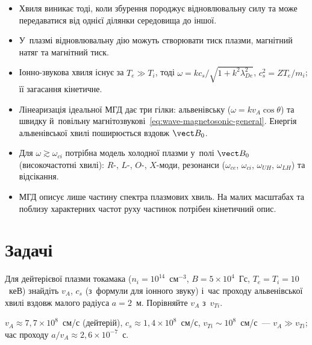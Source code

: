 \begin{Summary}
\begin{itemize}
\item Хвиля виникає тоді, коли збурення породжує відновлювальну силу та може передаватися
  від однієї ділянки середовища до іншої.

\item У~плазмі відновлювальну дію можуть створювати тиск плазми, магнітний натяг та
  магнітний тиск.

\item Іонно-звукова хвиля існує за $T_e\gg T_i$, тоді $\omega=kc_s/\sqrt{1+k^2\lambda_{De}^2}$, $c_s^2=ZT_e/m_i$; її загасання
  кінетичне.

\item Лінеаризація ідеальної МГД дає три гілки: альвенівську ($\omega=k v_A\cos\theta$) та швидку й~повільну
  магнітозвукові~\eqref{eq:wave-magnetosonic-general}. Енергія альвенівської хвилі
  поширюється вздовж $\vect B_0$.

\item Для $\omega\gtrsim\omega_{ci}$ потрібна модель холодної плазми у~полі $\vect B_0$ (високочастотні хвилі): $R$-, $L$-,
  $O$-, $X$-моди, резонанси ($\omega_{ce}$, $\omega_{ci}$, $\omega_{UH}$, $\omega_{LH}$) та відсікання.

\item МГД описує лише частину спектра плазмових хвиль. На малих масштабах та поблизу
  характерних частот руху частинок потрібен кінетичний опис.
\end{itemize}
\end{Summary}



\section*{Задачі}

\begin{problem}\label{prb:AlfvenSpeed}
	Для дейтерієвої плазми токамака ($n_i=10^{14}$~см$^{-3}$, $B=5\times10^4$~Гс,
	$T_e=T_i=10$~кеВ) знайдіть $v_A$, $c_s$ (з~формули для іонного звуку) і~час
	проходу альвенівської хвилі вздовж малого радіуса $a=2$~м. Порівняйте $v_A$ з~$v_{Ti}$.
	\begin{solution}
		$v_A\approx7{,}7\times10^{8}$~см/с (дейтерій), $c_s\approx1{,}4\times10^{8}$~см/с, $v_{Ti}\sim10^{8}$~см/с~--- $v_A\gg v_{Ti}$; час проходу $a/v_A\approx2{,}6\times10^{-7}$~с.
	\end{solution}
\end{problem}

